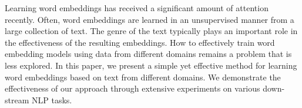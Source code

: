 Learning word embeddings has received a significant amount of attention recently. Often, word embeddings are learned in an unsupervised manner from a large collection of text. The genre of the text typically plays an important role in the effectiveness of the resulting embeddings. How to effectively train word embedding models using data from different domains remains a problem that is less explored. In this paper, we present a simple yet effective method for learning word embeddings based on text from different domains. We demonstrate the effectiveness of our approach through extensive experiments on various down-stream NLP tasks.
